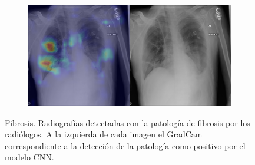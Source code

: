 \begin{figure}[b]
\begin{subfigure}{0.4\textwidth}
    \end{subfigure}
    \begin{subfigure}{0.4\textwidth}
        \centering
        \includegraphics[width=1.0\textwidth]{Chapters/5. Conclusiones/img/Fibrosis/1_1_00013993_125.png}
    \end{subfigure}

    \caption[short]{Fibrosis. Radiografías detectadas con la patología de fibrosis por los
                    radiólogos. A la izquierda de cada imagen el GradCam correspondiente a la detección
                    de la patología como positivo por el modelo CNN.}
\end{figure}

